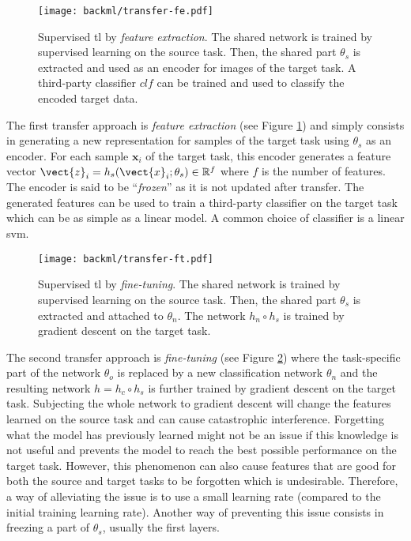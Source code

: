 \begin{figure}
  \centering
  \texttt{[image: backml/transfer-fe.pdf]}
  \caption{Supervised \acrlong{tl} by \textit{feature extraction}. The shared network is trained by supervised learning on the source task. Then, the shared part $\theta_s$ is extracted and used as an encoder for images of the target task. A third-party classifier $clf$ can be trained and used to classify the encoded target data.}
  \label{fig:backml:transfer-fe}
\end{figure}

The first transfer approach is \textit{feature extraction} (see Figure
\ref{fig:backml:transfer-fe}) and simply consists in generating a new representation
for samples of the target task using $\theta_s$ as an encoder. For each sample
$\mathbf{x}_i$ of the target task, this encoder generates a feature vector
$\vect{z}_i = h_s(\vect{x}_i;\theta_s) \in \mathbb{R}^f$ where $f$ is the number
of features. The encoder is said to be ``\textit{frozen}'' as it is not updated
after transfer. The generated features can be used to train a third-party classifier
on the target task which can be as simple as a linear model. A common choice of
classifier is a linear \acrshort{svm}.

\begin{figure}
  \centering
  \texttt{[image: backml/transfer-ft.pdf]}
  \caption{Supervised \acrlong{tl} by \textit{fine-tuning}. The shared network is trained by supervised learning on the source task. Then, the shared part $\theta_s$ is extracted and attached to $\theta_n$. The network $h_n \circ h_s$ is trained by gradient descent on the target task.}
  \label{fig:backml:transfer-ft}
\end{figure}

The second transfer approach is \textit{fine-tuning} (see Figure \ref{fig:backml:transfer-ft})
where the task-specific part of the network $\theta_{o}$ is replaced by a new
classification network $\theta_{n}$ and the resulting network $h = h_c \circ h_s$
is further trained by gradient descent on the target task. Subjecting the whole
network to gradient descent will change the features learned on the source task and 
can cause catastrophic interference. Forgetting what the model has previously learned might 
not be an issue if this knowledge is not useful and prevents the model to 
reach the best possible performance on the target task. However, this phenomenon can also cause features 
that are good for both the source and target tasks to be forgotten which is undesirable. 
Therefore, a way of alleviating the issue is to use a small learning rate (compared to the initial 
training learning rate). Another way of preventing this issue consists in freezing a part of
$\theta_s$, usually the first layers.

